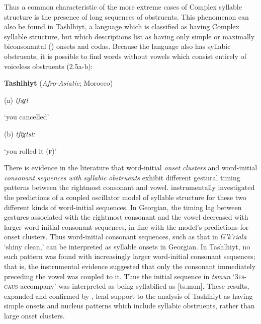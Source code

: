   Thus a common characteristic of the more extreme cases of Complex syllable structure is the presence of long sequences of obstruents. This phenomenon can also be found in Tashlhiyt, a language which is classified as having Complex syllable structure, but which descriptions list as having only simple \citep{Ridouane2008} or maximally biconsonantal (\citealt{PuechLouali1999}) onsets and codas. Because the language also has syllabic obstruents, it is possible to find words without vowels which consist entirely of voiceless obstruents (2.5a-b):

\ea\label{ex:(2.5)}
   \textbf{Tashlhiyt} (\textit{Afro-Asiatic}; Morocco)

(a)  \textit{tfsχt}

‘you cancelled’

(b)  \textit{tftχtstː}

‘you rolled it (\textsc{f})’

  \citep[95]{Ridouane2002}
\z

  There is evidence in the literature that word-initial \textit{onset} \textit{clusters} and word-initial \textit{consonant} \textit{sequences} \textit{with} \textit{syllabic} \textit{obstruents} exhibit different gestural timing patterns between the rightmost consonant and vowel. \citet{GoldsteinEtAl2007} instrumentally investigated the predictions of a coupled oscillator model of syllable structure for these two different kinds of word-initial sequences. In Georgian, the timing lag between gestures associated with the rightmost consonant and the vowel decreased with larger word-initial consonant sequences, in line with the model’s predictions for onset clusters. Thus word-initial consonant sequences, such as that in \textit{t͡s’k’ɾiala} ‘shiny clean,’ can be interpreted as syllable onsets in Georgian. In Tashlhiyt, no such pattern was found with increasingly larger word-initial consonant sequences; that is, the instrumental evidence suggested that only the consonant immediately preceding the vowel was coupled to it. Thus the initial sequence in \textit{tsmun} ‘\textsc{3fs}{}-\textsc{caus}{}-accompany’ was interpreted as being syllabified as [ts.mun]. These results, expanded and confirmed by \citet{HermesEtAl2011}, lend support to the analysis of Tashlhiyt as having simple onsets and nucleus patterns which include syllabic obstruents, rather than large onset clusters.

